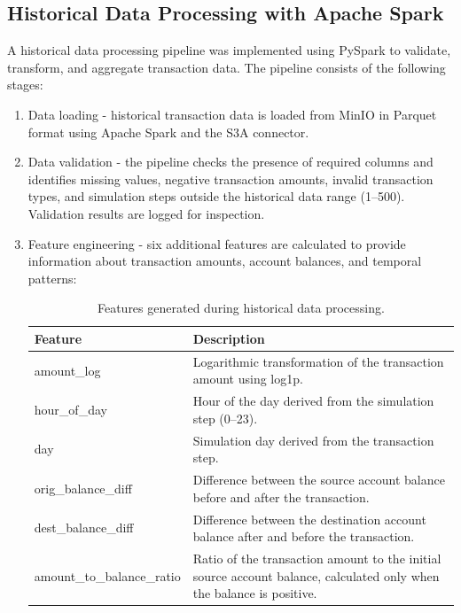 \documentclass[titlepage]{article}
\begin{document}
\subsection{Historical Data Processing with Apache Spark}
A historical data processing pipeline was implemented using PySpark to validate, transform, and aggregate transaction data. The pipeline consists of the following stages:
\begin{enumerate}
    \item Data loading - historical transaction data is loaded from MinIO in Parquet format using Apache Spark and the S3A connector.
    \item Data validation - the pipeline checks the presence of required columns and identifies missing values, negative transaction amounts, invalid transaction types, and simulation steps outside the historical data range (1–500). Validation results are logged for inspection.
    \item Feature engineering - six additional features are calculated to provide information about transaction amounts, account balances, and temporal patterns:
    \begin{table}[H]
    \centering
    \caption{Features generated during historical data processing.}
    \label{tab:historical_features}
    \small
    \begin{tabular}{lp{9cm}}
        \toprule
        \textbf{Feature} & \textbf{Description}\\
        \midrule
        amount\_log & Logarithmic transformation of the transaction amount using log1p.\\
        hour\_of\_day & Hour of the day derived from the simulation step (0--23).\\
        day & Simulation day derived from the transaction step.\\
        orig\_balance\_diff & Difference between the source account balance before and after the transaction.\\
        dest\_balance\_diff & Difference between the destination account balance after and before the transaction.\\
        amount\_to\_balance\_ratio & Ratio of the transaction amount to the initial source account balance, calculated only when the balance is positive.\\
        \bottomrule
    \end{tabular}
    \end{table}


\end{enumerate}
\end{document}
